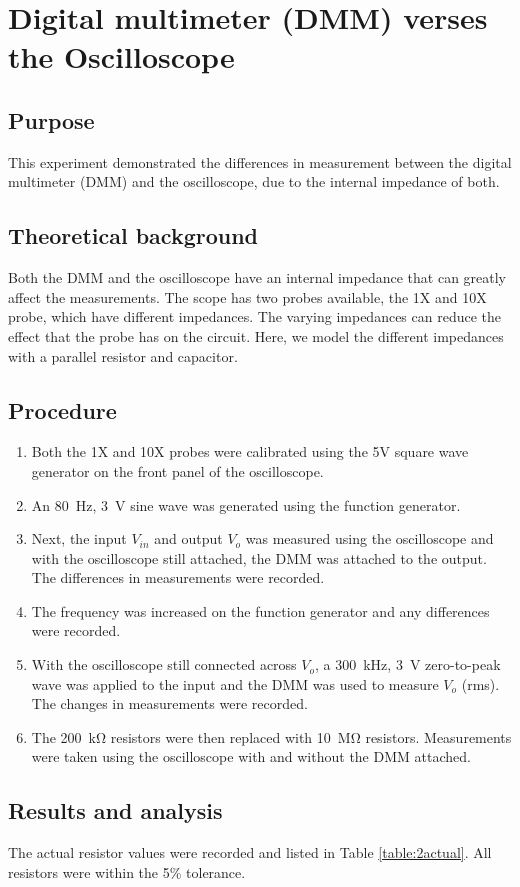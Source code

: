 \documentclass{report}
\begin{document}
\section{Digital multimeter (DMM) verses the Oscilloscope}
\subsection{Purpose}
This experiment demonstrated the differences in measurement between the digital multimeter (DMM) and the oscilloscope, due to the internal impedance of both.
\subsection{Theoretical background}
Both the DMM and the oscilloscope have an internal impedance that can greatly affect the measurements. The scope has two probes available, the 1X and 10X probe, which have different impedances. The varying impedances can reduce the effect that the probe has on the circuit. Here, we model the different impedances with a parallel resistor and capacitor.
\subsection{Procedure}
\begin{enumerate}
	\item Both the 1X and 10X probes were calibrated using the 5V square wave generator on the front panel of the oscilloscope.
	\item An \SI{80}{\Hz}, \SI{3}{\V} sine wave was generated using the function generator.
	\item Next, the input $V_{in}$ and output $V_o$ was measured using the oscilloscope and with the oscilloscope still attached, the DMM was attached to the output. The differences in measurements were recorded.
	\item The frequency was increased on the function generator and any differences were recorded.
	\item With the oscilloscope still connected across $V_o$, a \SI{300}{\kHz}, \SI{3}{\V} zero-to-peak wave was applied to the input and the DMM was used to measure $V_o$ (rms). The changes in measurements were recorded.
	\item The \SI{200}{\kilo\ohm} resistors were then replaced with \SI{10}{\mega\ohm} resistors. Measurements were taken using the oscilloscope with and without the DMM attached.
\end{enumerate}
\subsection{Results and analysis}
The actual resistor values were recorded and listed in Table \ref{table:2actual}. All resistors were within the 5\% tolerance.
\end{document}

